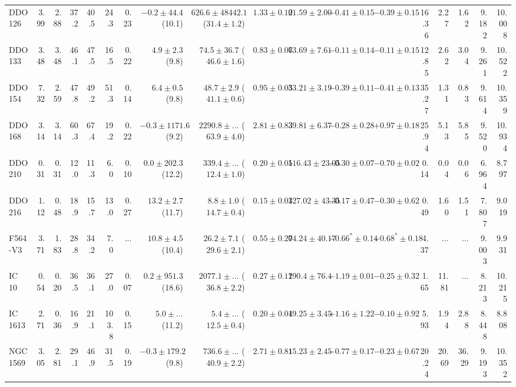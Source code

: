 \documentclass[natbib209]{emulateapj}
\begin{document}
\begin{table}
\begin{center}
{\begin{tabular}{@{}lrrrrrrrrrrrrrrrrr}
DDO 126			&   3.99	&   2.88 & 37.2 & 40.5	&  24.3 & 0.23  & $-0.2 \pm 44.4$ (10.1) & $626.6 \pm 48442.1$ ($31.4 \pm 1.2$) & $1.33 \pm 0.10$ & $21.59 \pm 2.00$	&$-0.41 \pm 0.15$		&$-0.39 \pm 0.15$	& 16.36 & 2.27 & 1.62 & 9.182 & 10.008 \\
DDO 133			&   3.48	&   3.48 & 46.1 & 47.5	&  16.5 & 0.22  & $4.9 \pm 2.3$ (9.8) & $74.5 \pm 36.7$ ($46.6 \pm 1.6$) & $0.83 \pm 0.06$ & $73.69 \pm 7.61$			&$-0.11 \pm 0.14$		&$-0.11 \pm 0.15$	& 12.85 & 2.62 & 3.04 & 9.261 & 10.522 \\
DDO 154			&   7.32	&   2.59 & 47.8 & 49.2	&  51.3 & 0.14  & $6.4 \pm 0.5$ (9.8) & $48.7 \pm 2.9$ ($41.1 \pm 0.6$) & $0.95 \pm 0.03$ & $53.21 \pm 3.19$			&$-0.39 \pm 0.11$		&$-0.41 \pm 0.13$	& 35.27 & 1.31 & 0.83 & 9.614 & 10.359 \\
DDO 168			&   3.14	&   3.14 & 60.3 & 67.4	&  19.2 & 0.22  & $-0.3 \pm 1171.6$ (9.2) & $2290.8 \pm ...$ ($63.9 \pm 4.0$) & $2.81 \pm 0.83$ & $39.81 \pm 6.37$		&$-0.28 \pm 0.28$		&$+0.97 \pm 0.18$	& 25.94 & 5.13 & 5.85 & 9.520 & 10.934 \\
DDO 210			&   0.31	&   0.31 & 12.0 & 11.3	&  6.0  & 0.10  & $0.0 \pm 202.3$ (12.2) & $339.4 \pm ...$ ($12.4 \pm 1.0$) & $0.20 \pm 0.05$ & $116.43 \pm 23.05$		&$-0.30 \pm 0.07$		&$-0.70 \pm 0.02$	& 0.14 & 0.04 & 0.06 & 6.964 & 8.797 \\
DDO 216			&   1.12	&   0.48 & 18.9 & 15.7	&  13.0 & 0.27  & $13.2 \pm 2.7$ (11.7) & $8.8 \pm 1.0$ ($14.7 \pm 0.4$) & $0.15 \pm 0.03$ & $127.02 \pm 43.35$			&$-0.17 \pm 0.47$		&$-0.30 \pm 0.62$	& 0.49 & 1.60 & 1.51 & 7.807  & 9.019 \\
F564-V3			&   3.71	&   1.83 & 28.8 & 34.2	&  7.0  & $...$ & $10.8 \pm 4.5$ (10.4) & $26.2 \pm 7.1$ ($29.6 \pm 2.1$) & $0.55 \pm 0.20$ & $74.24 \pm 40.17$			&$-0.66^{*} \pm 0.14$	&$-0.68^{*} \pm 0.18$	& 4.37 & $...$ & $...$ & 9.003 & 9.931 \\
IC 10			&   0.54	&   0.20 & 36.5 & 36.1	&  27.0 & 0.07  & $0.2 \pm 951.3$ (18.6) & $2077.1 \pm ...$ ($36.8 \pm 2.2$) & $0.27 \pm 0.12$ & $190.4 \pm 76.4$		&$-1.19 \pm 0.01$		&$-0.25 \pm 0.32$ 		& 1.65  & 11.81  & $...$ & 8.213  & 10.215 \\
IC 1613			&   2.71	&   0.36 & 16.9 & 21.1	&  103.8& 0.15  & $5.0 \pm ...$ (11.2) & $5.4 \pm ...$ ($12.5 \pm 0.4$) & $0.20 \pm 0.04$ & $19.25 \pm 3.45$			&$+1.16 \pm 1.22$		&$-0.10 \pm 0.92$		& 5.93 & 1.94 & 2.88 & 8.448 & 8.808 \\
NGC 1569		&   3.05	&   2.81 & 29.1 & 46.9	&  31.5 & 0.19  & $-0.3 \pm 179.2$ (9.8) & $736.6 \pm ...$ ($40.9 \pm 2.2$) & $2.71 \pm 0.81$ & $15.23 \pm 2.45$		&$-0.77 \pm 0.17$		&$-0.23 \pm 0.67$		& 20.24  & 20.69  & 36.29  & 9.193  & 10.352 \\

\end{tabular}}
\end{center}
\end{table}
\end{document}
